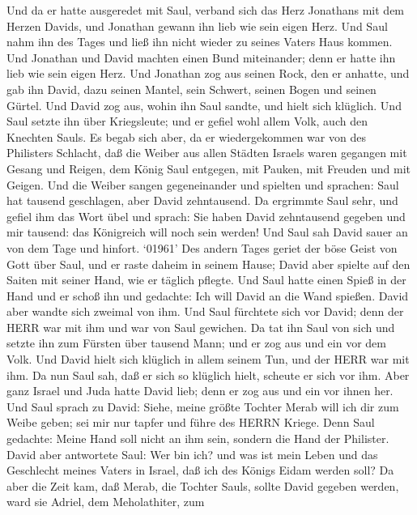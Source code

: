  Und da er hatte ausgeredet mit Saul, verband sich das Herz
Jonathans mit dem Herzen Davids, und Jonathan gewann ihn lieb wie sein
eigen Herz.  Und Saul nahm ihn des Tages und ließ ihn nicht
wieder zu seines Vaters Haus kommen.  Und Jonathan und David
machten einen Bund miteinander; denn er hatte ihn lieb wie sein eigen
Herz.  Und Jonathan zog aus seinen Rock, den er anhatte, und
gab ihn David, dazu seinen Mantel, sein Schwert, seinen Bogen und seinen
Gürtel.  Und David zog aus, wohin ihn Saul sandte, und hielt
sich klüglich. Und Saul setzte ihn über Kriegsleute; und er gefiel wohl
allem Volk, auch den Knechten Sauls.  Es begab sich aber, da
er wiedergekommen war von des Philisters Schlacht, daß die Weiber aus
allen Städten Israels waren gegangen mit Gesang und Reigen, dem König
Saul entgegen, mit Pauken, mit Freuden und mit Geigen.  Und
die Weiber sangen gegeneinander und spielten und sprachen: Saul hat
tausend geschlagen, aber David zehntausend.  Da ergrimmte
Saul sehr, und gefiel ihm das Wort übel und sprach: Sie haben David
zehntausend gegeben und mir tausend: das Königreich will noch sein
werden!  Und Saul sah David sauer an von dem Tage und
hinfort.  `01961' Des andern Tages geriet der böse Geist
von Gott über Saul, und er raste daheim in seinem Hause; David aber
spielte auf den Saiten mit seiner Hand, wie er täglich pflegte. Und Saul
hatte einen Spieß in der Hand  und er schoß ihn und
gedachte: Ich will David an die Wand spießen. David aber wandte sich
zweimal von ihm.  Und Saul fürchtete sich vor David; denn
der HERR war mit ihm und war von Saul gewichen.  Da tat ihn
Saul von sich und setzte ihn zum Fürsten über tausend Mann; und er zog
aus und ein vor dem Volk.  Und David hielt sich klüglich in
allem seinem Tun, und der HERR war mit ihm.  Da nun Saul
sah, daß er sich so klüglich hielt, scheute er sich vor ihm.
 Aber ganz Israel und Juda hatte David lieb; denn er zog
aus und ein vor ihnen her.  Und Saul sprach zu David:
Siehe, meine größte Tochter Merab will ich dir zum Weibe geben; sei mir
nur tapfer und führe des HERRN Kriege. Denn Saul gedachte: Meine Hand
soll nicht an ihm sein, sondern die Hand der Philister. 
David aber antwortete Saul: Wer bin ich? und was ist mein Leben und das
Geschlecht meines Vaters in Israel, daß ich des Königs Eidam werden
soll?  Da aber die Zeit kam, daß Merab, die Tochter Sauls,
sollte David gegeben werden, ward sie Adriel, dem Meholathiter, zum

